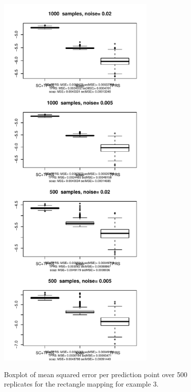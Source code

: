 \documentclass[a4paper,10pt]{amsart}
\begin{document}
\begin{figure}[p]
\centering
\includegraphics[width=3in]{figs-otherdomains/wigglytop2-boxplot.pdf} \\
\caption{Boxplot of mean squared error per prediction point over 500 replicates for the rectangle mapping for example 3. }
\label{wigglytop2-boxplots}
\end{figure}
\end{document}
